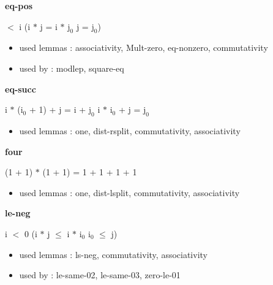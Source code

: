 \documentclass[a4paper]{article}
\begin{document}
\medskip

\bigskip

{\large\bf eq-pos}

\medskip

  $<$ i \Imp (i $*$ j = i $*$ $\mbox{j}_{0}$ \Equiv j = $\mbox{j}_{0}$)

\begin{itemize}


\item       used lemmas  : associativity, Mult-zero, eq-nonzero, commutativity
\item       used by      : modlep, square-eq

\end{itemize}

\medskip

\bigskip

{\large\bf eq-succ}

\medskip

 \Fol i $*$ ($\mbox{i}_{0}$ + 1) + j = i + $\mbox{j}_{0}$ \Equiv i $*$ $\mbox{i}_{0}$ + j = $\mbox{j}_{0}$

\begin{itemize}


\item       used lemmas  : one, dist-rsplit, commutativity, associativity

\end{itemize}

\medskip

\bigskip

{\large\bf four}

\medskip

 \Fol (1 + 1) $*$ (1 + 1) = 1 + 1 + 1 + 1

\begin{itemize}


\item       used lemmas  : one, dist-lsplit, commutativity, associativity

\end{itemize}

\medskip

\bigskip

{\large\bf le-neg}

\medskip

 \Fol i $<$ 0 \Imp (i $*$ j $\le$ i $*$ $\mbox{i}_{0}$ \Equiv $\mbox{i}_{0}$ $\le$ j)

\begin{itemize}


\item       used lemmas  : ls-neg, commutativity, associativity
\item       used by      : le-same-02, le-same-03, zero-le-01

\end{itemize}
\end{document}
